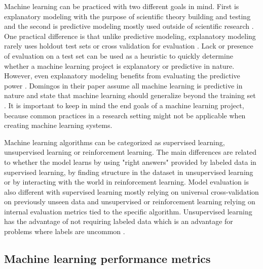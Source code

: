 Machine learning can be practiced with two different goals in mind. First is explanatory modeling with the purpose of scientific theory building and testing and the second is predictive modeling mostly used outside of scientific research \parencite{shmueliExplainPredict2010a}.
One practical difference is that unlike predictive modeling, explanatory modeling rarely uses holdout test sets or cross validation for evaluation \parencite{shmueliExplainPredict2010a}.
Lack or presence of evaluation on a test set can be used as a heuristic to quickly determine whether a machine learning project is explanatory or predictive in nature.
However, even explanatory modeling benefits from evaluating the predictive power \parencite{shmueliExplainPredict2010a}.
Domingos \parencite*{domingosFewUsefulThings2012} in their paper assume all machine learning is predictive in nature and state that machine learning should generalize beyond the training set .
It is important to keep in mind the end goals of a machine learning project, because common practices in a research setting might not be applicable when creating machine learning systems.

Machine learning algorithms can be categorized as supervised learning, unsupervised learning or reinforcement learning. %
The main differences are related to whether the model learns by using "right answers" provided by labeled data in supervised learning, by finding structure in the dataset in unsupervised learning or by interacting with the world in reinforcement learning. %
Model evaluation is also different with supervised learning mostly relying on universal cross-validation on previously unseen data and unsupervised or reinforcement learning relying on internal evaluation metrics tied to the specific algorithm. %
Unsupervised learning has the advantage of not requiring labeled data which is an advantage for problems where labels are uncommon \parencite{leBuildingHighlevelFeatures2012}.


\subsection{Machine learning performance metrics}
\label{sec:mlperf}


